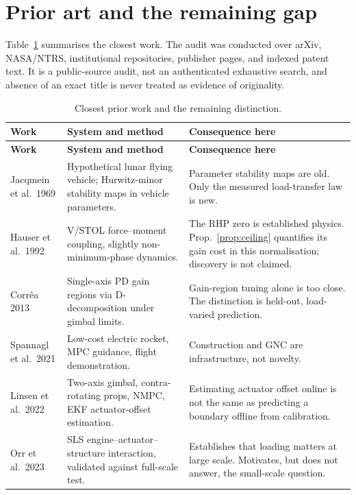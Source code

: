 \documentclass[11pt,a4paper]{article}
\begin{document}
\section{Prior art and the remaining gap}

Table~\ref{tab:prior} summarises the closest work. The audit was conducted over arXiv, NASA/NTRS,
institutional repositories, publisher pages, and indexed patent text. It is a public-source audit,
not an authenticated exhaustive search, and absence of an exact title is never treated as evidence
of originality.

\begin{longtable}{p{3.0cm}p{6.0cm}p{6.0cm}}
\caption{Closest prior work and the remaining distinction.}\label{tab:prior}\\
\toprule
\textbf{Work} & \textbf{System and method} & \textbf{Consequence here} \\
\midrule
\endfirsthead
\toprule
\textbf{Work} & \textbf{System and method} & \textbf{Consequence here} \\
\midrule
\endhead
Jacqmein et al.\ 1969 \cite{jacqmein1969} &
Hypothetical lunar flying vehicle; Hurwitz-minor stability maps in vehicle parameters. &
Parameter stability maps are old. Only the measured load-transfer law is new. \\
Hauser et al.\ 1992 \cite{hauser1992} &
V/STOL force--moment coupling, slightly non-minimum-phase dynamics. &
The RHP zero is established physics. Prop.~\ref{prop:ceiling} quantifies its gain cost in this
normalisation; discovery is not claimed. \\
Corr\^{e}a 2013 \cite{correa2013} &
Single-axis PD gain regions via D-decomposition under gimbal limits. &
Gain-region tuning alone is too close. The distinction is held-out, load-varied prediction. \\
Spannagl et al.\ 2021 \cite{spannagl2021} &
Low-cost electric rocket, MPC guidance, flight demonstration. &
Construction and GNC are infrastructure, not novelty. \\
Linsen et al.\ 2022 \cite{linsen2022} &
Two-axis gimbal, contra-rotating props, NMPC, EKF actuator-offset estimation. &
Estimating actuator offset online is not the same as predicting a boundary offline from calibration. \\
Orr et al.\ 2023 \cite{orr2023} &
SLS engine--actuator--structure interaction, validated against full-scale test. &
Establishes that loading matters at large scale. Motivates, but does not answer, the small-scale
question. \\

\end{longtable}
\end{document}
